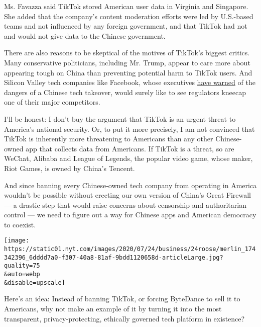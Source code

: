Ms. Favazza said TikTok stored American user data in Virginia and
Singapore. She added that the company's content moderation efforts were
led by U.S.-based teams and not influenced by any foreign government,
and that TikTok had not and would not give data to the Chinese
government.

There are also reasons to be skeptical of the motives of TikTok's
biggest critics. Many conservative politicians, including Mr. Trump,
appear to care more about appearing tough on China than preventing
potential harm to TikTok users. And Silicon Valley tech companies like
Facebook, whose executives
\href{https://www.cnbc.com/2019/10/17/facebook-ceo-zuckerberg-calls-out-tiktok-censorship-in-china.html}{have
warned} of the dangers of a Chinese tech takeover, would surely like to
see regulators kneecap one of their major competitors.

I'll be honest: I don't buy the argument that TikTok is an urgent threat
to America's national security. Or, to put it more precisely, I am not
convinced that TikTok is inherently more threatening to Americans than
any other Chinese-owned app that collects data from Americans. If TikTok
is a threat, so are WeChat, Alibaba and League of Legends, the popular
video game, whose maker, Riot Games, is owned by China's Tencent.

And since banning every Chinese-owned tech company from operating in
America wouldn't be possible without erecting our own version of China's
Great Firewall --- a drastic step that would raise concerns about
censorship and authoritarian control --- we need to figure out a way for
Chinese apps and American democracy to coexist.

\texttt{[image: https://static01.nyt.com/images/2020/07/24/business/24roose/merlin\_174342396\_6dddd7a0-f307-40a8-81af-9bdd1120658d-articleLarge.jpg?quality=75\\\&auto=webp\\\&disable=upscale]}

Here's an idea: Instead of banning TikTok, or forcing ByteDance to sell
it to Americans, why not make an example of it by turning it into the
most transparent, privacy-protecting, ethically governed tech platform
in existence?

